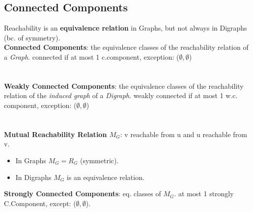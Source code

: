 \subsection*{Connected Components} 
Reachability is an \textbf{equivalence relation} in Graphs, but not always in Digraphs (bc. of symmetry). \\ 
\textbf{Connected Components}: the equivalence classes of the reachability relation of a \textit{Graph}. connected if at most 1 c.component, exception: ($\emptyset, \emptyset$) \\\\\\
\textbf{Weakly Connected Components}: the equivalence classes of the reachability relation of the \textit{induced graph} of a \textit{Digraph}. weakly connected if at most 1 w.c. component, exception: ($\emptyset, \emptyset$) \\ \\ \\
\textbf{Mutual Reachability Relation $M_G$}: v reachable from u and u reachable from v.  
\begin{itemize}[noitemsep,topsep=0pt,leftmargin=*]
    \item In Graphs $M_G = R_G$ (symmetric).
    \item In Digraphs $M_G$ is an equivalence relation.
\end{itemize}
\textbf{Strongly Connected Components}: eq. classes of $M_G$. at most 1 strongly C.Component, except: ($\emptyset, \emptyset$). \\
